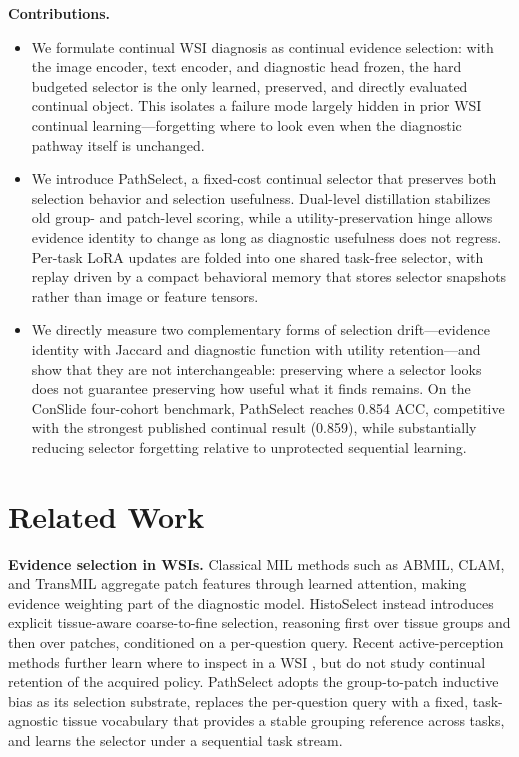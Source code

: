 \documentclass{article}
\begin{document}
\textbf{Contributions.}
\begin{itemize}
    \item We formulate continual WSI diagnosis as continual evidence selection: with the image encoder, text encoder, and diagnostic head frozen, the hard budgeted selector is the only learned, preserved, and directly evaluated continual object. This isolates a failure mode largely hidden in prior WSI continual learning---forgetting where to look even when the diagnostic pathway itself is unchanged.
    \item We introduce PathSelect, a fixed-cost continual selector that preserves both selection behavior and selection usefulness. Dual-level distillation stabilizes old group- and patch-level scoring, while a utility-preservation hinge allows evidence identity to change as long as diagnostic usefulness does not regress. Per-task LoRA updates are folded into one shared task-free selector, with replay driven by a compact behavioral memory that stores selector snapshots rather than image or feature tensors.
    \item We directly measure two complementary forms of selection drift---evidence identity with Jaccard and diagnostic function with utility retention---and show that they are not interchangeable: preserving where a selector looks does not guarantee preserving how useful what it finds remains. On the ConSlide four-cohort benchmark, PathSelect reaches 0.854 ACC, competitive with the strongest published continual result (0.859), while substantially reducing selector forgetting relative to unprotected sequential learning.
\end{itemize}

\section{Related Work}
\label{sec:related}

\textbf{Evidence selection in WSIs.}
Classical MIL methods such as ABMIL, CLAM, and TransMIL \cite{ilse2018abmil,lu2021clam,shao2021transmil} aggregate patch features through learned attention, making evidence weighting part of the diagnostic model. HistoSelect \cite{huang2026histoselect} instead introduces explicit tissue-aware coarse-to-fine selection, reasoning first over tissue groups and then over patches, conditioned on a per-question query. Recent active-perception methods further learn where to inspect in a WSI \cite{chen2026adaptivepath}, but do not study continual retention of the acquired policy. PathSelect adopts the group-to-patch inductive bias as its selection substrate, replaces the per-question query with a fixed, task-agnostic tissue vocabulary that provides a stable grouping reference across tasks, and learns the selector under a sequential task stream.
\end{document}
